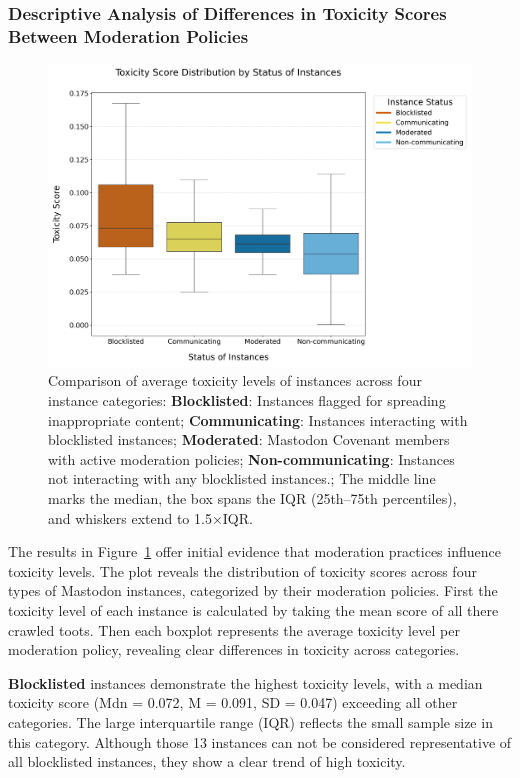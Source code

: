 \subsubsection{Descriptive Analysis of Differences in Toxicity Scores Between Moderation Policies}

\begin{figure}[tb]
    \centering
    \includegraphics[width=\textwidth]{../material/blocklist_vs_covenant_boxplot.png}
    \caption{Comparison of average toxicity levels of instances across four instance categories: 
    \textbf{Blocklisted}: Instances flagged for spreading inappropriate content; 
    \textbf{Communicating}: Instances interacting with blocklisted instances; 
    \textbf{Moderated}: Mastodon Covenant members with active moderation policies;
    \textbf{Non-communicating}: Instances not interacting with any blocklisted instances.;
    The middle line marks the median, the box spans the IQR (25th–75th percentiles), and whiskers extend to 1.5×IQR.}
    \label{blocklisted-vs-covenant}
\end{figure}

 The results in Figure~\ref{blocklisted-vs-covenant} offer initial evidence that moderation practices influence toxicity levels. The plot reveals the distribution of toxicity scores across four types of Mastodon instances, categorized by their moderation policies. First the toxicity level of each instance is calculated by taking the mean score of all there crawled toots. Then each boxplot represents the average toxicity level per moderation policy, revealing clear differences in toxicity across categories.

\textbf{Blocklisted} instances demonstrate the highest toxicity levels, with a median toxicity score (Mdn = 0.072, M = 0.091, SD = 0.047) exceeding all other categories. The large interquartile range (IQR) reflects the small sample size in this category. Although those 13 instances can not be considered representative of all blocklisted instances, they show a clear trend of high toxicity.


